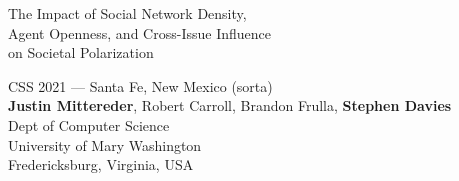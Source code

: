 \documentclass[12pt]{beamer}
\begin{document}
\begin{frame}[c]{}

\begin{center}
\Large
The Impact of Social Network Density,\\Agent Openness, and Cross-Issue
Influence\\on Societal Polarization

\footnotesize
\vspace{.3in}
CSS 2021 --- Santa Fe, New Mexico (sorta)\\
\vspace{.1in}
\textbf{Justin Mittereder}, Robert Carroll, Brandon Frulla,
\textbf{Stephen Davies}\\
\scriptsize
\smallskip
Dept of Computer Science\\
University of Mary Washington\\
Fredericksburg, Virginia, USA\\
\end{center}

\end{frame}
\end{document}
